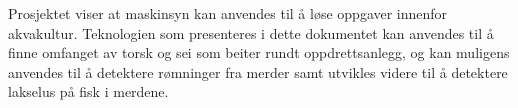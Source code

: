 
Prosjektet viser at maskinsyn kan anvendes til å løse oppgaver innenfor akvakultur. Teknologien som presenteres i dette dokumentet kan anvendes til å finne omfanget av torsk og sei som beiter rundt oppdrettsanlegg, og kan muligens anvendes til å detektere rømninger fra merder samt utvikles videre til å detektere lakselus på fisk i merdene.

